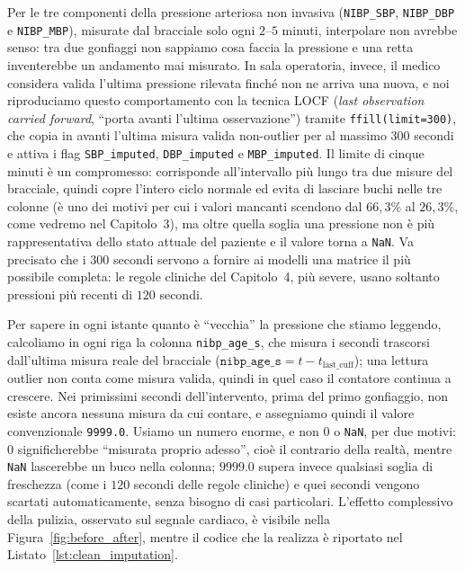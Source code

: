 Per le tre componenti della pressione arteriosa non invasiva (\texttt{NIBP\_SBP}, \texttt{NIBP\_DBP} e \texttt{NIBP\_MBP}), misurate dal bracciale solo ogni $2\text{--}5$ minuti, interpolare non avrebbe senso: tra due gonfiaggi non sappiamo cosa faccia la pressione e una retta inventerebbe un andamento mai misurato. In sala operatoria, invece, il medico considera valida l'ultima pressione rilevata finch\'e non ne arriva una nuova, e noi riproduciamo questo comportamento con la tecnica LOCF (\textit{last observation carried forward}, ``porta avanti l'ultima osservazione'') tramite \texttt{ffill(limit=300)}, che copia in avanti l'ultima misura valida non-outlier per al massimo $300$ secondi e attiva i flag \texttt{SBP\_imputed}, \texttt{DBP\_imputed} e \texttt{MBP\_imputed}. Il limite di cinque minuti \`e un compromesso: corrisponde all'intervallo pi\`u lungo tra due misure del bracciale, quindi copre l'intero ciclo normale ed evita di lasciare buchi nelle tre colonne (\`e uno dei motivi per cui i valori mancanti scendono dal $66,3\%$ al $26,3\%$, come vedremo nel Capitolo~3), ma oltre quella soglia una pressione non \`e pi\`u rappresentativa dello stato attuale del paziente e il valore torna a \texttt{NaN}. Va precisato che i $300$ secondi servono a fornire ai modelli una matrice il pi\`u possibile completa: le regole cliniche del Capitolo~4, pi\`u severe, usano soltanto pressioni pi\`u recenti di $120$ secondi.

Per sapere in ogni istante quanto \`e ``vecchia'' la pressione che stiamo leggendo, calcoliamo in ogni riga la colonna \texttt{nibp\_age\_s}, che misura i secondi trascorsi dall'ultima misura reale del bracciale ($\texttt{nibp\_age\_s} = t - t_{\text{last\_cuff}}$); una lettura outlier non conta come misura valida, quindi in quel caso il contatore continua a crescere. Nei primissimi secondi dell'intervento, prima del primo gonfiaggio, non esiste ancora nessuna misura da cui contare, e assegniamo quindi il valore convenzionale \texttt{9999.0}. Usiamo un numero enorme, e non $0$ o \texttt{NaN}, per due motivi: $0$ significherebbe ``misurata proprio adesso'', cio\`e il contrario della realt\`a, mentre \texttt{NaN} lascerebbe un buco nella colonna; $9999.0$ supera invece qualsiasi soglia di freschezza (come i $120$ secondi delle regole cliniche) e quei secondi vengono scartati automaticamente, senza bisogno di casi particolari. L'effetto complessivo della pulizia, osservato sul segnale cardiaco, \`e visibile nella Figura~\ref{fig:before_after}, mentre il codice che la realizza \`e riportato nel Listato~\ref{lst:clean_imputation}.

